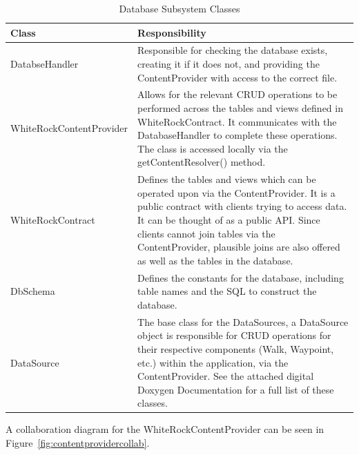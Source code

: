 \documentclass[11pt,a4paper]{report}
\begin{document}
\begin{longtable}{|p{5cm}|p{10cm}|}
\hline \caption{Database Subsystem Classes - Cont. on Next Page} \endfoot
\hline \caption{Database Subsystem Classes} \label{tab:database} \endlastfoot
\hline
\textbf{Class} & \textbf{Responsibility} \\ \hline
DatabseHandler & Responsible for checking the database exists, creating it if it does not, and providing the ContentProvider with access to the correct file. \\ \hline
WhiteRockContentProvider & Allows for the relevant CRUD operations to be performed across the tables and views defined in WhiteRockContract. It communicates with the DatabaseHandler to complete these operations. The class is accessed locally via the getContentResolver() method.  \\ \hline
WhiteRockContract & Defines the tables and views which can be operated upon via the ContentProvider. It is a public contract with clients trying to access data. It can be thought of as a public API. Since clients cannot join tables via the ContentProvider, plausible joins are also offered as well as the tables in the database. \\ \hline
DbSchema & Defines the constants for the database, including table names and the SQL to construct the database. \\ \hline
DataSource & The base class for the DataSources, a DataSource object is responsible for CRUD operations for their respective components (Walk, Waypoint, etc.) within the application, via the ContentProvider. See the attached digital Doxygen Documentation for a full list of these classes.  \\ \hline
\end{longtable}

A collaboration diagram for the WhiteRockContentProvider can be seen in Figure~\ref{fig:contentprovidercollab}.
\end{document}
